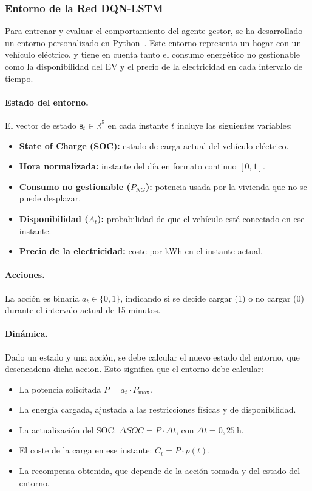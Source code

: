 \subsubsection{Entorno de la Red DQN-LSTM}
Para entrenar y evaluar el comportamiento del agente gestor, se ha desarrollado un entorno 
personalizado en Python~\cite{python2024language}. Este entorno representa un hogar con un vehículo 
eléctrico, y tiene en cuenta tanto el consumo energético no gestionable como la disponibilidad  del 
EV y el precio de la electricidad en cada intervalo de tiempo.

\paragraph{Estado del entorno.}
El vector de estado \(\mathbf{s}_t \in \mathbb{R}^5\) en cada instante \(t\) incluye las siguientes 
variables:
\begin{itemize}
    \item \textbf{State of Charge (SOC):} estado de carga actual del vehículo eléctrico.
    \item \textbf{Hora normalizada:} instante del día en formato continuo \([0, 1]\).
    \item \textbf{Consumo no gestionable (\(P_{NG}\)):} potencia usada por la vivienda que no se 
    puede desplazar.
    \item \textbf{Disponibilidad (\(A_t\)):} probabilidad de que el vehículo esté conectado en ese 
    instante.
    \item \textbf{Precio de la electricidad:} coste por kWh en el instante actual.
\end{itemize}

\paragraph{Acciones.} 
La acción es binaria \(a_t \in \{0, 1\}\), indicando si se decide cargar (1) o no cargar (0) 
durante el intervalo actual de 15 minutos.

\paragraph{Dinámica.} 
Dado un estado y una acción, se debe calcular el nuevo estado del entorno, que desencadena dicha 
accion. Esto significa que el entorno debe calcular:
\begin{itemize}
    \item La potencia solicitada \(P = a_t \cdot P_{\text{max}}\).
    \item La energía cargada, ajustada a las restricciones físicas y de disponibilidad.
    \item La actualización del SOC: 
    \(\Delta SOC = P \cdot \Delta t\), con \(\Delta t = 0{,}25~\text{h}\).
    \item El coste de la carga en ese instante: \(C_t = P \cdot p(t)\).
    \item La recompensa obtenida, que depende de la acción tomada y del estado del entorno.
\end{itemize}


